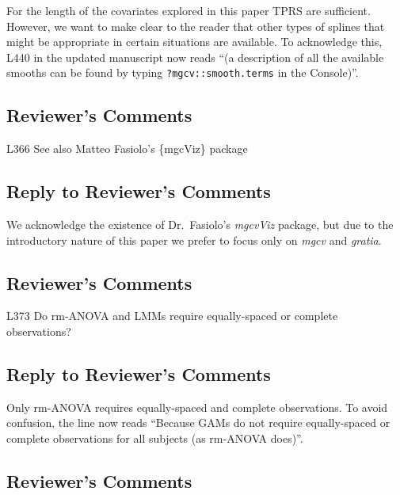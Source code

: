 \documentclass[
]{article}
\newcommand{\passthrough}[1]{#1}
\begin{document}
For the length of the covariates explored in this paper TPRS are sufficient. However, we want to make clear to the reader that other types of splines that might be appropriate in certain situations are available. To acknowledge this, L440 in the updated manuscript now reads ``(a description of all the available smooths can be found by typing \passthrough{\lstinline!?mgcv::smooth.terms!} in the Console)''.

\hypertarget{reviewers-comments-30}{%
\subsection{Reviewer's Comments}\label{reviewers-comments-30}}

L366 See also Matteo Fasiolo's \{mgcViz\} package

\hypertarget{section-31}{%
\subsection{\texorpdfstring{\textcolor{reviewersblue} {Reply to Reviewer's Comments}}{}}\label{section-31}}

We acknowledge the existence of Dr.~Fasiolo's \emph{mgcvViz} package, but due to the introductory nature of this paper we prefer to focus only on \emph{mgcv} and \emph{gratia}.

\hypertarget{reviewers-comments-31}{%
\subsection{Reviewer's Comments}\label{reviewers-comments-31}}

L373 Do rm-ANOVA and LMMs require equally-spaced or complete observations?

\hypertarget{section-32}{%
\subsection{\texorpdfstring{\textcolor{reviewersblue} {Reply to Reviewer's Comments}}{}}\label{section-32}}

Only rm-ANOVA requires equally-spaced and complete observations. To avoid confusion, the line now reads ``Because GAMs do not require equally-spaced or complete observations for all subjects (as rm-ANOVA does)''.

\hypertarget{reviewers-comments-32}{%
\subsection{Reviewer's Comments}\label{reviewers-comments-32}}
\end{document}

